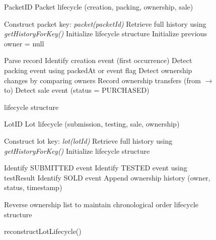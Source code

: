 \documentclass[12pt]{article}
\begin{document}
	
		\begin{figure}[h]
		\centering
		\caption{Packet and Lot Lifecycle Reconstruction Mechanisms}
		\label{fig:lifecycle_reconstruction}
		
		\begin{minipage}[t]{0.48\linewidth}
			\vspace{0pt}
			\centering
			\begin{algorithm}[H]
				\caption{reconstructPacketLifecycle()}
				\begin{algorithmic}[1]
					
					\Require PacketID
					\Ensure Packet lifecycle (creation, packing, ownership, sale)
					
					\State Construct packet key: \textit{packet(packetId)}
					\State Retrieve full history using \textit{getHistoryForKey()}
					\State Initialize lifecycle structure
					\State Initialize previous owner = null
					
					\State Parse record
					\State Identify creation event (first occurrence)
					\State Detect packing event using packedAt or event flag
					\State Detect ownership changes by comparing owners
					\State Record ownership transfers (from $\rightarrow$ to)
					\State Detect sale event (status = PURCHASED)
					\EndFor
					
					\State \Return lifecycle structure
					
				\end{algorithmic}
			\end{algorithm}
		\end{minipage}
		\hfill
		\begin{minipage}[t]{0.48\linewidth}
			\vspace{0pt}
			\centering
			\begin{algorithm}[H]
				\caption{reconstructLotLifecycle()}
				\begin{algorithmic}[1]
					
					\Require LotID
					\Ensure Lot lifecycle (submission, testing, sale, ownership)
					
					\State Construct lot key: \textit{lot(lotId)}
					\State Retrieve full history using \textit{getHistoryForKey()}
					\State Initialize lifecycle structure
					
					\For{each historical record}
					\State Identify SUBMITTED event
					\State Identify TESTED event using testResult
					\State Identify SOLD event
					\State Append ownership history (owner, status, timestamp)
					\EndFor
					
					\State Reverse ownership list to maintain chronological order
					\State \Return lifecycle structure
					
				\end{algorithmic}
			\end{algorithm}
		\end{minipage}
		
	\end{figure}
	
\end{document}

